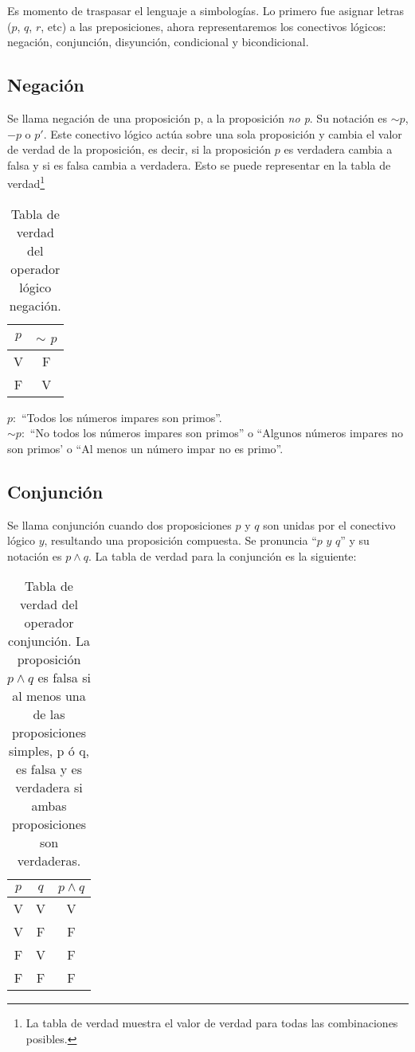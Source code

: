 Es momento de traspasar el lenguaje a simbologías. Lo primero fue asignar letras ($p$, $q$, $r$, etc) a las preposiciones, ahora representaremos los conectivos lógicos: negación, conjunción, disyunción, condicional y bicondicional.

\subsection{Negación}
Se llama negación de una proposición p, a la proposición \textit{no p}. Su notación es $\sim p$, $-p$ o $p'$. Este conectivo lógico actúa sobre una sola proposición y cambia el valor de verdad de la proposición, es decir, si la proposición $p$ es verdadera cambia a falsa y si es falsa cambia a verdadera. Esto se puede representar  en la tabla de verdad\footnote{La tabla de verdad muestra el valor de verdad para todas las combinaciones posibles.}
\begin{table}[h!]
	\begin{center}
		\begin{tabular}{|c|c|}
\hline
$p$&$\sim$ $p$\\
\hline
V&F\\
\hline
F&V\\
\hline
		\end{tabular}
	\end{center}
\caption[Tabla de verdad del operador lógico negación.]{Tabla de verdad del operador lógico negación.}
\end{table}

\begin{myexample}
\end{myexample}
\noindent $p:$ ``Todos los números impares son primos''.\\
$\sim p:$ ``No todos los números impares son primos'' o ``Algunos números impares no son primos' o ``Al menos un número impar no es primo''. 

\subsection{Conjunción}
Se llama conjunción cuando dos proposiciones $p$ y $q$ son unidas por el conectivo lógico $y$, resultando una proposición compuesta. Se pronuncia ``$p$ $y$ $q$'' y su notación es $p\wedge q$. La tabla de verdad para la conjunción es la siguiente:
\begin{table}[h!]
	\begin{center}
		\begin{tabular}{|c|c|c|}
\hline
$p$&$q$&$p\wedge q$\\
\hline
V&V&V\\
\hline
V&F&F\\
\hline
F&V&F\\
\hline
F&F&F\\
\hline
		\end{tabular}
	\end{center}
\caption[Tabla de verdad del operador lógico conjunción.]{Tabla de verdad del operador conjunción. La proposición $p\wedge q$ es falsa si al menos una de las proposiciones simples, p ó q, es falsa y es verdadera si ambas proposiciones son verdaderas.}
\end{table}

